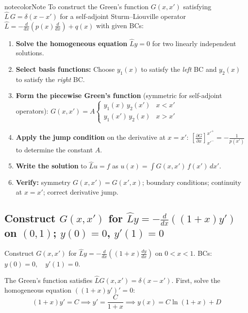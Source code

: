 \documentclass[a4paper,11pt]{article} %
\newenvironment{notebox}[1][]{\begin{custombox}[#1]{notecolor}{Note}}{\end{custombox}}
\begin{document}
\begin{notebox}[title={General Procedure: Constructing Green's Functions}]
To construct the Green's function $G(x,x')$ satisfying $\hat{L}\,G = \delta(x-x')$ for a self-adjoint Sturm--Liouville operator $\hat{L} = -\frac{d}{dx}\!\left(p(x)\frac{d}{dx}\right)+q(x)$ with given BCs:
\begin{enumerate}
    \item \textbf{Solve the homogeneous equation} $\hat{L}y = 0$ for two linearly independent solutions.
    \item \textbf{Select basis functions:} Choose $y_1(x)$ to satisfy the \emph{left} BC and $y_2(x)$ to satisfy the \emph{right} BC.
    \item \textbf{Form the piecewise Green's function} (symmetric for self-adjoint operators):
    $G(x,x') = A\begin{cases} y_1(x)\,y_2(x') & x < x' \\ y_1(x')\,y_2(x) & x > x' \end{cases}$
    \item \textbf{Apply the jump condition} on the derivative at $x = x'$:
    $\left[\frac{\partial G}{\partial x}\right]_{x'^-}^{x'^+} = -\frac{1}{p(x')}$
    to determine the constant $A$.
    \item \textbf{Write the solution} to $\hat{L}u = f$ as $u(x) = \int G(x,x')\,f(x')\,dx'$.
    \item \textbf{Verify:} symmetry $G(x,x')=G(x',x)$; boundary conditions; continuity at $x=x'$; correct derivative jump.
\end{enumerate}
\end{notebox}

\subsection{\texorpdfstring{Construct $G(x,x')$ for $\hat{L}y=-\tfrac{d}{dx}\!\left((1+x)y'\right)$ on $(0,1)$; $y(0)=0$, $y'(1)=0$}{Green's function for SL operator: left/right basis solutions, jump condition gives $A=1$}}

\begin{problembox}
Construct $G(x, x')$ for $\hat{L}y = -\frac{d}{dx}\left( (1+x) \frac{dy}{dx} \right)$ on $0 < x < 1$.
BCs: $y(0) = 0, \quad y'(1) = 0$.
\end{problembox}

The Green's function satisfies $\hat{L}G(x, x') = \delta(x-x')$.
First, solve the homogeneous equation $((1+x)y')' = 0$:
$$ (1+x)y' = C \implies y' = \frac{C}{1+x} \implies y(x) = C \ln(1+x) + D $$
\end{document}
